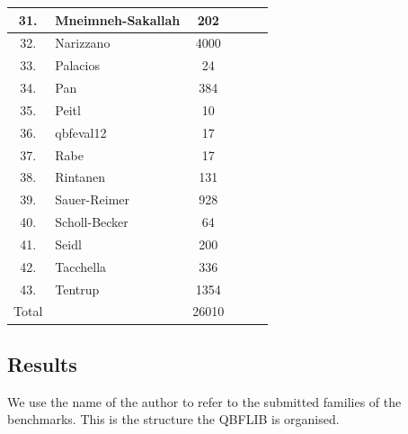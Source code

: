 \documentclass[runningheads]{llncs}
\begin{document}
\begin{table}
\begin{tabular}{c|l|c|c|c|c}
31. & Mneimneh-Sakallah &  202 & &  &  \\ \hline

32. & Narizzano &  4000 & &  &  \\ \hline

33. & Palacios & 24 &  &  &  \\ \hline

34. & Pan &  384 & &  &  \\ \hline

35. & Peitl & 10 &  &  &  \\\hline

36. & qbfeval12 & 17 & &  &  \\ \hline

37. & Rabe &  17 &  & &  \\ \hline

38. & Rintanen &  131 & &  &  \\\hline

39. & Sauer-Reimer &  928 & &  & \\ \hline

40. & Scholl-Becker & 64 &  &  &  \\ \hline

41. & Seidl &  200 &  &  &  \\ \hline

42. & Tacchella &  336 & &  &  \\ \hline

43. & Tentrup & 1354 &  &  &  \\ \hline \hline

Total &  & 26010 &  &  &  \\  \hline \hline


\hline
\end{tabular}
\end{table}


\subsection{Results}
We use the name of the author to refer to the submitted families of the benchmarks. This is the structure the QBFLIB is organised.
\end{document}
